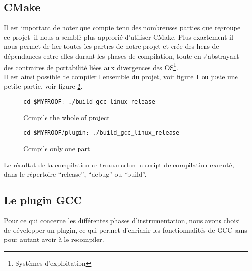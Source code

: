 
\subsection{CMake}

Il est important de noter que compte tenu des nombreuses parties que regroupe ce projet, il nous a semblé plus approrié d'utiliser CMake. Plus exactement il nous permet de lier toutes les parties de notre projet et crée des liens de dépendances entre elles durant les phases de compilation, toute en s'abstrayant des contraires de portabilité liées aux divergences des OS\footnote{Systèmes d'exploitation}.\\

Il est ainsi possible de compiler l'ensemble du projet, voir figure \ref{fig:compile_whole_project} ou juste une petite partie, voir figure \ref{fig:compile_one_part}.

\begin{figure}[here]
  \centering
  \verb#cd $MYPROOF; ./build_gcc_linux_release#
  \caption{Compile the whole of project}
  \label{fig:compile_whole_project}
\end{figure}

\begin{figure}[here]
  \centering
  \verb#cd $MYPROOF/plugin; ./build_gcc_linux_release#
  \caption{Compile only one part}
  \label{fig:compile_one_part}
\end{figure}

Le résultat de la compilation se trouve selon le script de compilation executé, dans le répertoire ``release'', ``debug'' ou ``build''.

\subsection{Le plugin GCC}

Pour ce qui concerne les différentes phases d'instrumentation, nous avons choisi de développer un plugin, ce qui permet d'enrichir les fonctionnalités de GCC sans pour autant avoir à le recompiler.


